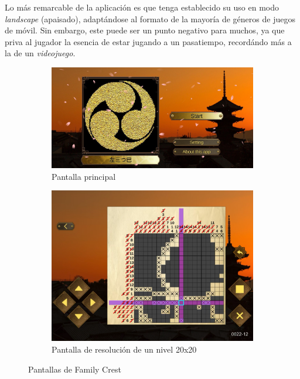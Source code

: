 \documentclass[11pt,spanish,listoffigures,listoftables]{tfgetsinf}
\begin{document}
 Lo más remarcable de la aplicación es que tenga establecido su uso en modo \textit{landscape} (apaisado), adaptándose al formato de la mayoría de géneros
 de juegos de móvil. Sin embargo, este puede ser un punto negativo para muchos, ya que priva al jugador la esencia de estar jugando a un pasatiempo,
 recordándo más a la de un \textit{videojuego}.

 \begin{figure}[h!]
  \centering
  \begin{subfigure}[b]{0.49\linewidth}
    \includegraphics[width=\linewidth]{images/familycrest1.jpg}
    \caption{Pantalla principal}
    \label{fig:family1-1}
  \end{subfigure}
  \begin{subfigure}[b]{0.49\linewidth}
    \includegraphics[width=\linewidth]{images/familycrest2.png}
    \caption{Pantalla de resolución de un nivel 20x20}
    \label{fig:family1-2}
  \end{subfigure}
  \caption{Pantallas de Family Crest}
  \label{fig:family1}
\end{figure}
\end{document}
